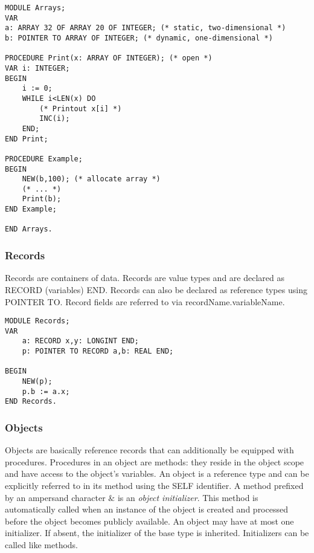 \documentclass[a4paper,11pt]{article}
\begin{document}
\begin{lstlisting}[language=Oberon,frame=none,caption=Using arrays]
MODULE Arrays;
VAR
a: ARRAY 32 OF ARRAY 20 OF INTEGER; (* static, two-dimensional *)
b: POINTER TO ARRAY OF INTEGER; (* dynamic, one-dimensional *)

PROCEDURE Print(x: ARRAY OF INTEGER); (* open *)
VAR i: INTEGER;
BEGIN
    i := 0;
    WHILE i<LEN(x) DO
        (* Printout x[i] *)
        INC(i);
    END;
END Print;

PROCEDURE Example;
BEGIN
    NEW(b,100); (* allocate array *)
    (* ... *)
    Print(b);
END Example;

END Arrays.
\end{lstlisting}

\subsubsection{Records}\label{section:Records}
Records are containers of data. Records are value types and are declared as RECORD (variables) END. Records can also be declared as reference types using POINTER TO. Record fields are referred to via recordName.variableName.
\begin{lstlisting}[language=Oberon,frame=none,caption=Using records]
MODULE Records;
VAR
	a: RECORD x,y: LONGINT END;
	p: POINTER TO RECORD a,b: REAL END;

BEGIN
	NEW(p);
	p.b := a.x;
END Records.
\end{lstlisting}

\subsubsection{Objects}\label{section:Objects}
Objects are basically reference records that can additionally be equipped with procedures. Procedures in an object are methods: they reside in the object scope and have access to the object's variables. An object is a reference type and can be explicitly referred to in its method using the SELF identifier.
A method prefixed by an ampersand character $\&$ is an \emph{object initializer}. This method is automatically called when an instance of the object is created and processed before the object becomes publicly available. An object may have at most one initializer. If absent, the initializer of the base type is inherited. Initializers can be called like methods.
\end{document}
